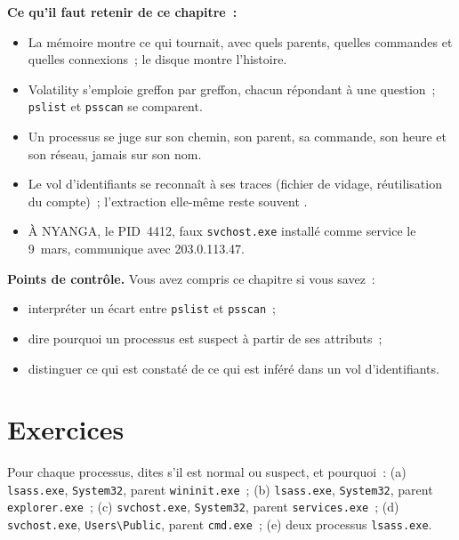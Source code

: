 \begin{boxresume}
\textbf{Ce qu'il faut retenir de ce chapitre~:}
\begin{itemize}
    \item La mémoire montre ce qui tournait, avec quels parents, quelles
          commandes et quelles connexions~; le disque montre l'histoire.
    \item Volatility s'emploie greffon par greffon, chacun répondant à une
          question~; \texttt{pslist} et \texttt{psscan} se comparent.
    \item Un processus se juge sur son chemin, son parent, sa commande, son
          heure et son réseau, jamais sur son nom.
    \item Le vol d'identifiants se reconnaît à ses traces (fichier de
          vidage, réutilisation du compte)~; l'extraction elle-même reste
          souvent \NEK{}.
    \item À NYANGA, le PID~4412, faux \texttt{svchost.exe} installé comme
          service le 9~mars, communique avec 203.0.113.47.
\end{itemize}
\end{boxresume}

\begin{boxinfo}
\textbf{Points de contrôle.} Vous avez compris ce chapitre si vous savez~:
\begin{itemize}
    \item interpréter un écart entre \texttt{pslist} et \texttt{psscan}~;
    \item dire pourquoi un processus est suspect à partir de ses attributs~;
    \item distinguer ce qui est constaté de ce qui est inféré dans un vol
          d'identifiants.
\end{itemize}
\end{boxinfo}

\section*{Exercices}

\begin{boxexo}[title={\ding{45}\quad Exercice~5.1. Normal ou suspect \niveaubase}]
Pour chaque processus, dites s'il est normal ou suspect, et pourquoi~:
(a) \texttt{lsass.exe}, \texttt{System32}, parent \texttt{wininit.exe}~;
(b) \texttt{lsass.exe}, \texttt{System32}, parent \texttt{explorer.exe}~;
(c) \texttt{svchost.exe}, \texttt{System32}, parent \texttt{services.exe}~;
(d) \texttt{svchost.exe}, \texttt{Users\textbackslash Public}, parent
\texttt{cmd.exe}~; (e) deux processus \texttt{lsass.exe}.
\end{boxexo}


